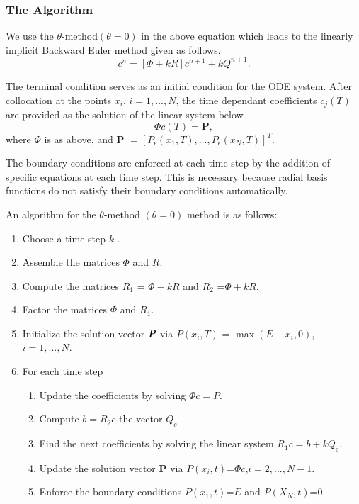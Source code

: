 \documentclass[12pt]{article}
\numberwithin{equation}{subsection} %
\begin{document}
\subsubsection{The Algorithm}
 We use the $\theta$-method$(\theta=0)$  in the above equation  which leads to the linearly implicit Backward Euler method given as follows.
\vspace{5mm}
\begin{equation}
[\Phi-kR]c^n=[\Phi +kR]c^{n+1}+kQ^{n+1}.
\end{equation}

The terminal condition serves as an initial condition for the ODE
system. After collocation at the points $x_i$, $i=1,\ldots,N$, the
time dependant coefficients $c_j(T)$ are provided as the solution of
the linear system below
\begin{equation*}
\Phi c(T)=\textbf{P},
\end{equation*}
where $\Phi$ is as above, and
  $ \textbf{P }= [P_\epsilon(x_1,T),\ldots,P_\epsilon(x_N,T)]^T$.

The boundary conditions are enforced at each time step by the
addition of specific equations at each time step. This is necessary
because radial basis functions do not satisfy their boundary
conditions automatically.


An algorithm for  the $\theta$-method $(\theta=0)$ method is as
follows\cite{Fas02}:

\begin{enumerate}
\item Choose a time step $k$ .
\item Assemble the matrices $\Phi$ and $R$.
\item Compute the matrices $R_1$ = $\Phi-k R$ and $R_2$ =$ \Phi+kR$.
\item Factor the matrices $\Phi$ and $R_1$.
\item Initialize the solution vector  $\textit{\textbf{P}}$ via $P(x_i,T)$ = $\max (E-x_i,0)$, $i=1,...,N$.
\item For each time step
\begin{enumerate}
\item Update the coefficients by solving $\Phi c=P$.
\item Compute $ b=R_{2}c$ the vector $Q_c$
\item Find the next coefficients by solving the linear system $R_{1}c=b+kQ_{c}$.
\item Update the solution vector $\boldsymbol{P}$ via $P(x_i,t)$=$\Phi c$,$i=2,...,N-1$.
\item Enforce the boundary conditions $P(x_1,t)$=$E$ and $P(X_N,t)$=$0$.
\end{enumerate}
\end{enumerate}
\end{document}
